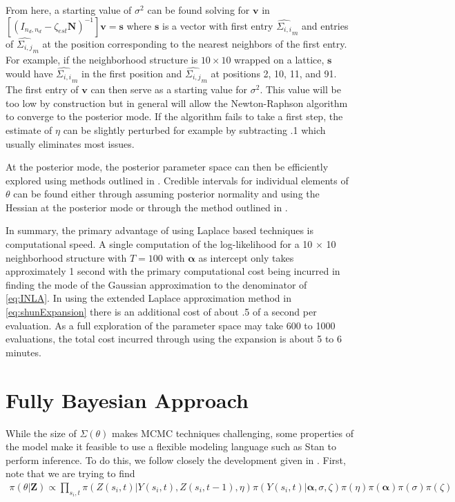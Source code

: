 \documentclass[11pt]{isuthesis}
\begin{document}
	From here, a starting value of $\sigma^2$ can be found solving for $\boldsymbol{v}$ in $\left[(I_{{n_d},{n_d}}-\zeta_{est}\boldsymbol{N})^{-1}\right]\boldsymbol{v}=\boldsymbol{s}$ where $\boldsymbol{s}$ is a vector with first entry $\widehat{\Sigma_{i,i}}_m$ and entries of $\widehat{\Sigma_{i,j}}_m$ at the position corresponding to the nearest neighbors of the first entry.  For example, if the neighborhood structure is $10 \times 10$ wrapped on a lattice, $\boldsymbol{s}$ would have $\widehat{\Sigma_{i,i}}_m$ in the first position and $\widehat{\Sigma_{i,j}}_m$ at positions 2, 10, 11, and 91.  The first entry of $\boldsymbol{v}$ can then serve as a starting value for $\sigma^2$. This value will be too low by construction but in general will allow the Newton-Raphson algorithm to converge to the posterior mode.  If the algorithm fails to take a first step, the estimate of $\eta$ can be slightly perturbed for example by subtracting .1 which usually eliminates most issues.
	
	At the posterior mode, the posterior parameter space can then be efficiently explored using methods outlined in \cite{rue2009approximate}.  Credible intervals for individual elements of $\theta$ can be found either through assuming posterior normality and using the Hessian at the posterior mode or through the method outlined in \cite{ferkingstad2015improving}.  
	
	In summary, the primary advantage of using Laplace based techniques is computational speed.  A single computation of the log-likelihood for a 10 $\times$ 10 neighborhood structure with $T=100$ with $\boldsymbol{\alpha}$ as intercept only takes approximately 1 second with the primary computational cost being incurred in finding the mode of the Gaussian approximation to the denominator of \eqref{eq:INLA}.  In using the extended Laplace approximation method in \eqref{eq:shunExpansion} there is an additional cost of about .5 of a second per evaluation.  As a full exploration of the parameter space may take 600 to 1000 evaluations, the total cost incurred through using the expansion is about 5 to 6 minutes.
	\section{Fully Bayesian Approach}
	
	While the size of $\Sigma(\theta)$ makes MCMC techniques challenging, some properties of the model make it feasible to use a flexible modeling language such as Stan to perform inference.  To do this, we follow closely the development given in \cite{joseph}.  First, note that we are trying to find
	\begin{align}
	\pi(\theta | \boldsymbol{Z})\propto \prod_{s_i,t} \pi(Z(s_i,t)|Y(s_i,t),Z(s_i,t-1),\eta) \pi(Y(s_i,t)|\boldsymbol{\alpha},\sigma,\zeta)\pi(\eta)\pi(\boldsymbol{\alpha})\pi(\sigma)\pi(\zeta)
	\end{align}
	
\end{document}
